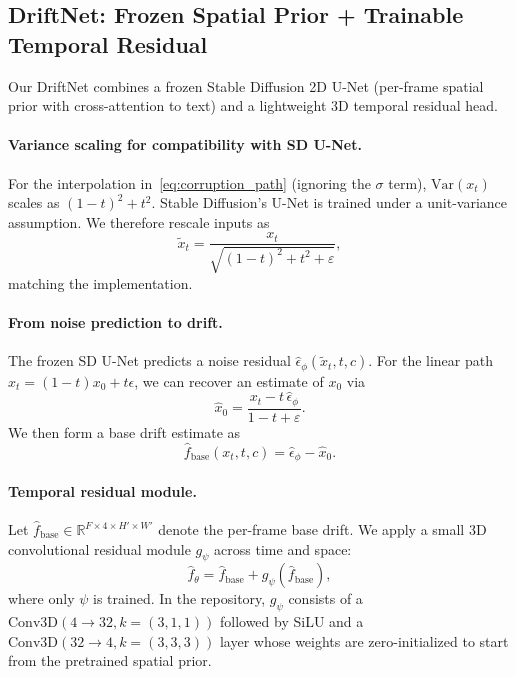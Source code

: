 \documentclass[journal]{IEEEtran}
\begin{document}
\subsection{DriftNet: Frozen Spatial Prior + Trainable Temporal Residual}
Our DriftNet combines a frozen Stable Diffusion 2D U-Net (per-frame spatial prior with cross-attention to text) and a lightweight 3D temporal residual head.

\paragraph{Variance scaling for compatibility with SD U-Net.}
For the interpolation in~\eqref{eq:corruption_path} (ignoring the $\sigma$ term), $\mathrm{Var}(x_t)$ scales as $(1-t)^2+t^2$. Stable Diffusion's U-Net is trained under a unit-variance assumption. We therefore rescale inputs as
\begin{equation}
\tilde{x}_t = \frac{x_t}{\sqrt{(1-t)^2+t^2 + \varepsilon}},
\label{eq:variance_scaling}
\end{equation}
matching the implementation.

\paragraph{From noise prediction to drift.}
The frozen SD U-Net predicts a noise residual $\hat{\epsilon}_\phi(\tilde{x}_t,t,c)$. For the linear path $x_t=(1-t)x_0+t\epsilon$, we can recover an estimate of $x_0$ via
\begin{equation}
\hat{x}_0 = \frac{x_t - t\,\hat{\epsilon}_\phi}{1-t+\varepsilon}.
\label{eq:x0_recovery}
\end{equation}
We then form a base drift estimate as
\begin{equation}
\hat{f}_{\text{base}}(x_t,t,c)=\hat{\epsilon}_\phi-\hat{x}_0.
\label{eq:base_drift}
\end{equation}

\paragraph{Temporal residual module.}
Let $\hat{f}_{\text{base}}\in\mathbb{R}^{F\times 4\times H'\times W'}$ denote the per-frame base drift. We apply a small 3D convolutional residual module $g_\psi$ across time and space:
\begin{equation}
\hat{f}_{\theta}=\hat{f}_{\text{base}} + g_{\psi}(\hat{f}_{\text{base}}),
\label{eq:temporal_residual}
\end{equation}
where only $\psi$ is trained. In the repository, $g_\psi$ consists of a $\text{Conv3D}(4\to32, k=(3,1,1))$ followed by SiLU and a $\text{Conv3D}(32\to4, k=(3,3,3))$ layer whose weights are zero-initialized to start from the pretrained spatial prior.
\end{document}
